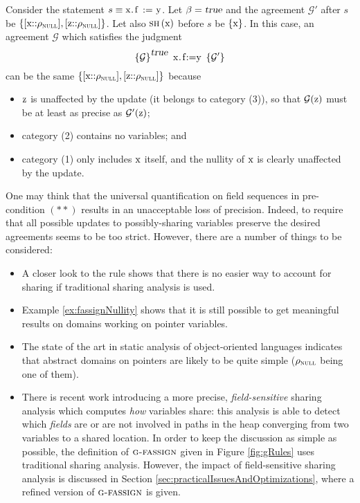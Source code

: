 \documentclass[prodmode,acmtocl]{acmsmall}
\def\uco{\ensuremath{\rho}\xspace}
\newcommand{\true}{\mbox{\sl true}}
\newcommand{\0}{\mbox{\bf 0}}
\newcommand{\CODE}[1]{\ensuremath{\mbox{\lstinline!#1!}\xspace}\xspace}
\def\xx{\CODE{x}}
\def\zz{\CODE{z}}
\def\NULLDOM{\ensuremath{\uco_{\textsc{null}}}\xspace}
\def\PRED{\beta}
\def\AGREEM{\mathcal{G}}
\newcommand{\AGRS}[2]{[#2{::}#1]}
\newcommand{\GRULENAME}[1]{\textsc{g-#1}}
\newcommand{\TRIPLEB}[4]{\left\{#1\right\}^{#2}\ #3\ \left\{#4\right\}}
\newcommand{\SHARE}[1]{\textsc{sh}\left(#1\right)}
\begin{document}
\begin{example}
  \label{ex:fassignNullity}
  Consider the statement $s \equiv \CODE{x.f := y}$.  Let $\PRED =
  \true$ and the agreement $\AGREEM'$ after $s$ be $\{
  \AGRS{\NULLDOM}{\mbox{\xx}}, \AGRS{\NULLDOM}{\mbox{\zz}} \}$.  Let
  also $\SHARE{\mbox{\xx}}$ before $s$ be $\{ \mbox{\xx} \}$.  In this
  case, an agreement $\AGREEM$ which satisfies the judgment
  \[ \TRIPLEB{\AGREEM}{\true}{\mbox{\CODE{x.f:=y}}}{\AGREEM'} \]
  can be the same $\{ \AGRS{\NULLDOM}{\mbox{\xx}}, \AGRS{\NULLDOM}{\mbox{\zz}} \}$
  because
  \begin{itemize}
  \item \zz is unaffected by the update (it belongs to category (3)),
    so that $\AGREEM(\mbox{\zz})$ must be at least as precise as
    $\AGREEM'(\mbox{\zz})$;
  \item category (2) contains no variables; and
  \item category (1) only includes \xx itself, and the nullity of \xx
    is clearly unaffected by the update.
  \end{itemize}
\end{example}

One may think that the universal quantification on field sequences in
pre-condition $({*}{*})$ results in an unacceptable loss of precision.
Indeed, to require that all possible updates to possibly-sharing
variables preserve the desired agreements seems to be too strict.
However, there are a number of things to be considered:
\begin{itemize}
\item A closer look to the rule shows that there is no easier way to
  account for sharing if traditional sharing analysis is used.
\item Example \ref{ex:fassignNullity} shows that it is still possible
  to get meaningful results on domains working on pointer variables.
\item The state of the art in static analysis of object-oriented
  languages indicates that abstract domains on pointers are likely to
  be quite simple ($\NULLDOM$ being one of them).
\item There is recent work \cite{ZanardiniG15sh} introducing a more
  precise, \emph{field-sensitive} sharing analysis which computes
  \emph{how} variables share: this analysis is able to detect which
  \emph{fields} are or are not involved in paths in the heap
  converging from two variables to a shared location.  In order to
  keep the discussion as simple as possible, the definition of
  $\GRULENAME{fassign}$ given in Figure \ref{fig:gRules} uses
  traditional sharing analysis.  However, the impact of
  field-sensitive sharing analysis is discussed in Section
  \ref{sec:practicalIssuesAndOptimizations}, where a refined version
  of $\GRULENAME{fassign}$ is given.
\end{itemize}
\end{document}

